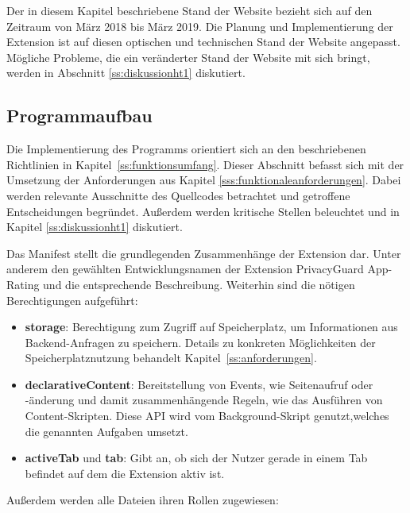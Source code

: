 Der in diesem Kapitel beschriebene Stand der Website bezieht sich auf den Zeitraum von März 2018 bis März 2019. Die Planung und Implementierung der Extension ist auf diesen optischen und technischen Stand der Website angepasst. Mögliche Probleme, die ein veränderter Stand der Website mit sich bringt, werden in Abschnitt \ref{ss:diskussionht1} diskutiert.

\subsection{Programmaufbau}
\label{ss:programmaufbau}
Die Implementierung des Programms orientiert sich an den beschriebenen Richtlinien in Kapitel~\ref{ss:funktionsumfang}. Dieser Abschnitt befasst sich mit der Umsetzung der Anforderungen aus Kapitel \ref{sss:funktionaleanforderungen}. Dabei werden relevante Ausschnitte des Quellcodes betrachtet und getroffene Entscheidungen begründet. Außerdem werden kritische Stellen beleuchtet und in Kapitel \ref{ss:diskussionht1} diskutiert.




Das Manifest stellt die grundlegenden Zusammenhänge der Extension dar. Unter anderem den gewählten Entwicklungsnamen der Extension \glqq PrivacyGuard App-Rating\grqq{} und die entsprechende Beschreibung.
Weiterhin sind die nötigen Berechtigungen aufgeführt:

\begin{itemize}
	\item \textbf{storage}:
	Berechtigung zum Zugriff auf Speicherplatz, um Informationen aus Backend-Anfragen zu speichern. Details zu konkreten Möglichkeiten der Speicherplatznutzung behandelt Kapitel~\ref{ss:anforderungen}.
	\item \textbf{declarativeContent}:
	Bereitstellung von Events, wie Seitenaufruf oder -änderung und damit zusammenhängende Regeln, wie das Ausführen von Content-Skripten. Diese API wird vom Background-Skript genutzt,welches die genannten Aufgaben umsetzt.
	\item \textbf{activeTab} und \textbf{tab}:
	Gibt an, ob sich der Nutzer gerade in einem Tab befindet auf dem die Extension aktiv ist.
\end{itemize}

Außerdem werden alle Dateien ihren Rollen zugewiesen:

